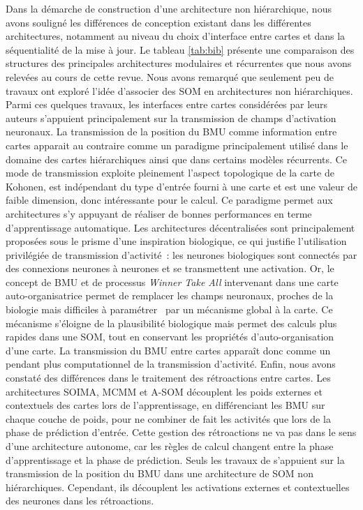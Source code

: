 \documentclass[../main]{subfiles}
\begin{document}
Dans la démarche de construction d'une architecture non hiérarchique, nous avons souligné les différences de conception existant dans les différentes architectures, notamment au niveau du choix d'interface entre cartes et dans la séquentialité de la mise à jour.
Le tableau \ref{tab:bib} présente une comparaison des structures des principales architectures modulaires et récurrentes que nous avons relevées au cours de cette revue.
Nous avons remarqué que seulement peu de travaux ont exploré l'idée d'associer des SOM en architectures non hiérarchiques. Parmi ces quelques travaux, les interfaces entre cartes considérées par leurs auteurs s'appuient principalement sur la transmission de champs d'activation neuronaux.
La transmission de la position du BMU comme information entre cartes apparait au contraire comme un paradigme principalement utilisé dans le domaine des cartes hiérarchiques ainsi que dans certains modèles récurrents.
Ce mode de transmission exploite pleinement l'aspect topologique de la carte de Kohonen, est indépendant du type d'entrée fourni à une carte et est une valeur de faible dimension, donc intéressante pour le calcul. Ce paradigme permet aux architectures s'y appuyant de réaliser de bonnes performances en terme d'apprentissage automatique.
Les architectures décentralisées sont principalement proposées sous le prisme d'une inspiration biologique, ce qui justifie l'utilisation privilégiée de transmission d'activité~: les neurones biologiques sont connectés par des connexions neurones à neurones et se transmettent une activation. 
Or, le concept de BMU et de processus \emph{Winner Take All} intervenant dans une carte auto-organisatrice permet de remplacer les champs neuronaux, proches de la biologie mais difficiles à paramétrer~\parencite{fix:hal-00869726} par un mécanisme global à la carte. Ce mécanisme s'éloigne de la plausibilité biologique mais permet des calculs plus rapides dans une SOM, tout en conservant les propriétés d'auto-organisation d'une carte. La transmission du BMU entre cartes apparaît donc comme un pendant plus computationnel de la transmission d'activité. 
Enfin, nous avons constaté des différences dans le traitement des rétroactions entre cartes. Les architectures SOIMA, MCMM et A-SOM découplent les poids externes et contextuels des cartes lors de l'apprentissage, en différenciant les BMU sur chaque couche de poids, pour ne combiner de fait les activités que lors de la phase de prédiction d'entrée. 
Cette gestion des rétroactions ne va pas dans le sens d'une architecture autonome, car les règles de calcul changent entre la phase d'apprentissage et la phase de prédiction.
Seuls les travaux de \cite{dominey13} s'appuient sur la transmission de la position du BMU dans une architecture de SOM non hiérarchiques. Cependant, ils découplent les activations externes et contextuelles des neurones dans les rétroactions.
\end{document}
